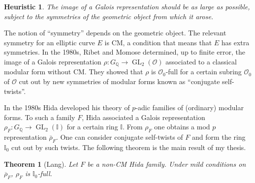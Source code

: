 \documentclass[12pt]{article}
\newcommand{\Q}{\mathbb{Q}}
\newcommand{\I}{\mathbb{I}}
\newcommand{\OK}{\ensuremath{\mathcal{O}}}
\newtheorem*{theorem}{Theorem}
\newtheorem*{heuristic}{Heuristic}
\DeclareMathOperator{\GL}{GL}
\begin{document}
\begin{heuristic}
The image of a Galois representation should be as large as possible, subject to the symmetries of the geometric object from which it arose.
\end{heuristic}

The notion of ``symmetry'' depends on the geometric object.  The relevant symmetry for an elliptic curve $E$ is CM, a condition that means that $E$ has extra symmetries.  In the 1980s, Ribet and Momose determined, up to finite error, the image of a Galois representation $\rho: G_\Q \to \GL_2(\OK)$ associated to a classical modular form without CM.  They showed that $\rho$ is $\OK_0$-full for a certain subring $\OK_0$ of $\OK$ cut out by new symmetries of modular forms known as ``conjugate self-twists''.  

In the 1980s Hida developed his theory of $p$-adic families of (ordinary) modular forms.  To such a family $F$, Hida associated a Galois representation $\rho_F : G_\Q \to \GL_2(\I)$ for a certain ring $\I$.  From $\rho_F$ one obtains a mod $p$ representation $\bar{\rho}_F$.  One can consider conjugate self-twists of $F$ and form the ring $\I_0$ cut out by such twists.  The following theorem is the main result of my thesis.

\begin{theorem}[Lang]\label{thesis}
Let $F$ be a non-CM Hida family.  Under mild conditions on $\overline{\rho}_F$, $\rho_F$ is $\I_0$-full.
\end{theorem}

\end{document}
